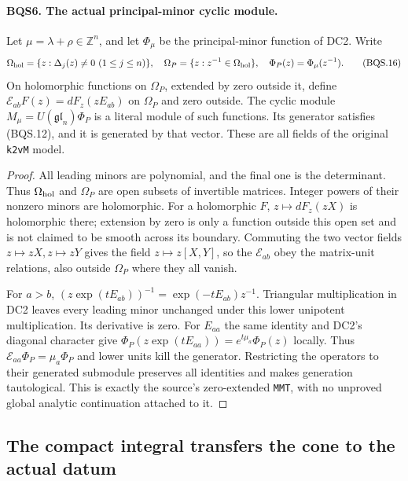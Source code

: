 \documentclass[11pt,a4paper]{article}
\numberwithin{equation}{section}
\theoremstyle{remark}\newtheorem{remark}[theorem]{Remark}
\begin{document}
\paragraph{BQS6. The actual principal-minor cyclic module.}
\label{claim:BQS6}
Let $\mu=\lambda+\rho\in\mathbb Z^n$, and let $\Phi_\mu$ be the
principal-minor function of DC2.  Write
\[
 \Omega_{\rm hol}=\{z:\Delta_j(z)\ne0\ (1\le j\le n)\},\quad
 \Omega_P=\{z:z^{-1}\in\Omega_{\rm hol}\},\quad
 \Phi_P(z)=\Phi_\mu(z^{-1}).
 \tag{BQS.16}
\]
On holomorphic functions on $\Omega_P$, extended by zero outside it,
define
$\mathcal E_{ab}F(z)=dF_z(zE_{ab})$ on $\Omega_P$ and zero outside.
The cyclic module $M_\mu=U(\mathfrak{gl}_n)\Phi_P$ is a literal module
of such functions.  Its generator satisfies (BQS.12), and it is
generated by that vector.  These are all fields of the original
\texttt{k2v\allowbreak M} model.

\begin{proof}
All leading minors are polynomial, and the final one is the determinant.
Thus $\Omega_{\rm hol}$ and $\Omega_P$ are open subsets of invertible
matrices.  Integer powers of their nonzero minors are holomorphic.
For a holomorphic $F$, $z\mapsto dF_z(zX)$ is holomorphic there;
extension by zero is only a function outside this open set and is not
claimed to be smooth across its boundary.
Commuting the two vector fields $z\mapsto zX,z\mapsto zY$ gives
the field $z\mapsto z[X,Y]$, so the $\mathcal E_{ab}$ obey the
matrix-unit relations, also outside $\Omega_P$ where they all vanish.

For $a>b$, $(z\exp(tE_{ab}))^{-1}=\exp(-tE_{ab})z^{-1}$.
Triangular multiplication in DC2 leaves every leading minor unchanged
under this lower unipotent multiplication.  Its derivative is zero.
For $E_{aa}$ the same identity and DC2's diagonal character give
$\Phi_P(z\exp(tE_{aa}))=e^{t\mu_a}\Phi_P(z)$ locally.
Thus $\mathcal E_{aa}\Phi_P=\mu_a\Phi_P$ and lower units kill the
generator.  Restricting the operators to their generated submodule
preserves all identities and makes generation tautological.
This is exactly the source's zero-extended \texttt{MMT}, with no
unproved global analytic continuation attached to it.
\end{proof}

\subsection{The compact integral transfers the cone to the actual datum}
\end{document}
